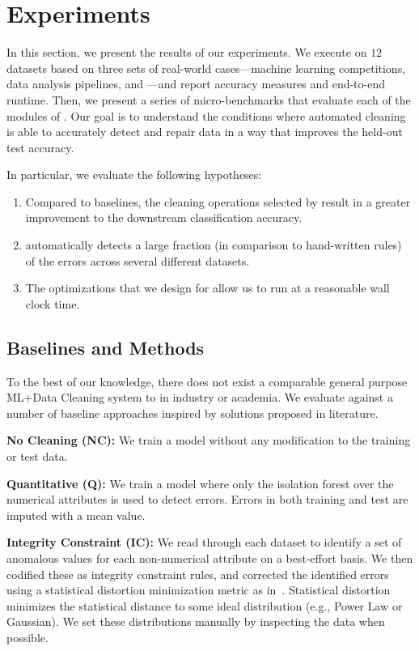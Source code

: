 \section{Experiments}\label{s:exp}
In this section, we present the results of our experiments.  We execute \sys on $12$ datasets based on three sets of real-world cases---machine learning competitions, data analysis pipelines, and \company---and report accuracy measures and end-to-end runtime.  Then, we present a series of micro-benchmarks that evaluate each of the modules of \sys.  Our goal is to understand the conditions where automated cleaning is able to accurately detect and repair data in a way that improves the held-out test accuracy. 

In particular, we evaluate the following hypotheses:
\begin{enumerate}
    \item Compared to baselines, the cleaning operations selected by \sys result in a greater improvement to the downstream classification accuracy.
    \item \sys automatically detects a large fraction (in comparison to hand-written rules) of the errors across several different datasets.
    \item The optimizations that we design for \sys allow us to run at a reasonable wall clock time.
\end{enumerate}

\subsection{Baselines and Methods}
To the best of our knowledge, there does not exist a comparable general purpose ML+Data Cleaning system to \sys in industry or academia.
We evaluate \sys against a number of baseline approaches inspired by solutions proposed in literature. 

\vspace{0.25em}\noindent\textbf{No Cleaning (NC): } We train a model without any modification to the training or test data.

\vspace{0.25em}\noindent\textbf{Quantitative (Q): } We train a model where only the isolation forest over the numerical attributes is used to detect errors.
Errors in both training and test are imputed with a mean value.

\vspace{0.25em}\noindent\textbf{Integrity Constraint (IC): } We read through each dataset to identify a set of anomalous values for each non-numerical attribute on a best-effort basis.  We then codified these as integrity constraint rules, and corrected the identified errors using a statistical distortion minimization metric as in~\cite{prokoshyna2015combining}. Statistical distortion minimizes the statistical distance to some ideal distribution (e.g., Power Law or Gaussian). We set these distributions manually by inspecting the data when possible.

